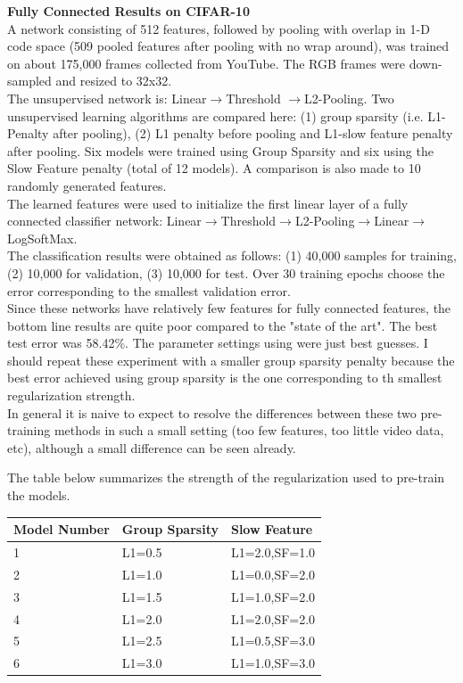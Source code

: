 \documentclass[12pt,a4paper]{report}
\begin{document}
\noindent
{\bf Fully Connected Results on CIFAR-10} \\ 

A network consisting of 512 features, followed by pooling with overlap in 1-D code space (509 pooled features after pooling with no wrap around), was trained on about 175,000 frames collected from YouTube.
The RGB frames were down-sampled and resized to 32x32. \\ 

The unsupervised network is: Linear$\rightarrow$Threshold $\rightarrow$L2-Pooling.
Two unsupervised learning algorithms are compared here: (1) group sparsity (i.e. L1-Penalty after pooling), (2) L1 penalty before pooling and L1-slow feature penalty after pooling. 
Six models were trained using Group Sparsity and six using the Slow Feature penalty (total of 12 models).  
A comparison is also made to 10 randomly generated features. \\

The learned features were used to initialize the first linear layer of a fully connected classifier network: Linear$\rightarrow$Threshold$\rightarrow$L2-Pooling$\rightarrow$Linear$\rightarrow$LogSoftMax. \\

The classification results were obtained as follows: (1) 40,000 samples for training, (2) 10,000 for validation, (3) 10,000 for test. Over 30 training epochs choose the error  corresponding to the smallest validation error. \\

Since these networks have relatively few features for fully connected features, the bottom line results are quite poor compared to the "state of the art". The best test error was 58.42\%. 
The parameter settings using were just best guesses. I should repeat these experiment with a smaller group sparsity penalty because the best error achieved using group sparsity is the one corresponding to th smallest regularization strength. \\ 

In general it is naive to expect to resolve the differences between these two pre-training methods in such a small setting (too few features, too little video data, etc), although a small difference can be seen already. 

\newpage 
The table below summarizes the strength of the regularization used to pre-train the models.  
\begin{center}
    \begin{tabular}{| l | l | l |}
    \hline
   Model Number &  Group Sparsity & Slow Feature\\ \hline
    1&L1=0.5&L1=2.0,SF=1.0 \\ 
    2&L1=1.0&L1=0.0,SF=2.0 \\
    3&L1=1.5&L1=1.0,SF=2.0 \\    
    4&L1=2.0&L1=2.0,SF=2.0 \\      
	5&L1=2.5&L1=0.5,SF=3.0 \\    
	6&L1=3.0&L1=1.0,SF=3.0 \\ 
    \hline
    \end{tabular}
\end{center}
\end{document}
